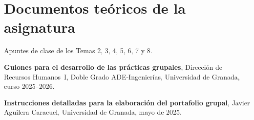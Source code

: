 \section*{Documentos teóricos de la asignatura}

\begin{enumerate}[label={[\arabic*]}, resume]

  \item Apuntes de clase de los Temas 2, 3, 4, 5, 6, 7 y 8.

  \item \textbf{Guiones para el desarrollo de las prácticas grupales},
        Dirección de Recursos Humanos~I, Doble Grado ADE-Ingenierías,
        Universidad de Granada, curso 2025--2026.

  \item \textbf{Instrucciones detalladas para la elaboración del portafolio
        grupal}, Javier Aguilera Caracuel, Universidad de Granada, mayo de 2025.

\end{enumerate}

\endinput

